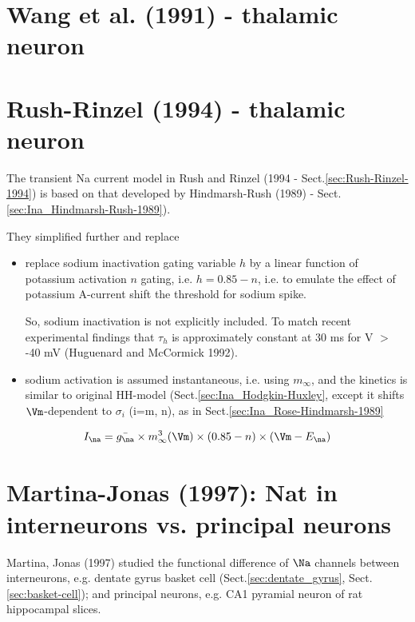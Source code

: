 \section{Wang et al. (1991) - thalamic neuron}
\label{sec:Ina_Wang1991}

\section{Rush-Rinzel (1994) - thalamic neuron}
\label{sec:Ina_Rush-Rinzel1994}

The transient Na current model in Rush and Rinzel (1994 -
Sect.\ref{sec:Rush-Rinzel-1994}) is based on that developed by Hindmarsh-Rush
(1989) - Sect.\ref{sec:Ina_Hindmarsh-Rush-1989}).

They simplified further and replace 
\begin{itemize}
  
  \item replace sodium inactivation gating variable $h$ by a linear function of
  potassium activation $n$ gating, i.e. $h = 0.85 - n$, i.e. to emulate the
  effect of potassium A-current shift the threshold for sodium spike.

So, sodium inactivation is not explicitly included.
To match recent experimental findings that $\tau_h$ is approximately constant at
30 ms for V $>$ -40 mV (Huguenard and McCormick 1992).

  
  \item sodium activation is assumed instantaneous, i.e. using $m_\infty$, and 
  the kinetics is similar to original HH-model
  (Sect.\ref{sec:Ina_Hodgkin-Huxley}, except it shifts $\Vm$-dependent to
  $\sigma_i$ (i=m, n), as in Sect.\ref{sec:Ina_Rose-Hindmarsh-1989}
  
\end{itemize}

\begin{equation}
I_\na = \bar{g_\na} \times m_\infty^3(\Vm) \times (0.85 - n) \times (\Vm -
E_\na)
\end{equation}


\section{Martina-Jonas (1997): Nat in interneurons vs. principal neurons}
\label{sec:Nat-Martina-Jonas-1997-interneuron-DG-basket-cells}
\label{sec:Nat-Martina-Jonas-1997-pyramidal-CA1}

Martina, Jonas (1997) studied the functional difference of $\Na$ channels
between interneurons, e.g. dentate gyrus basket cell
(Sect.\ref{sec:dentate_gyrus}, Sect.\ref{sec:basket-cell}); and principal
neurons, e.g. CA1 pyramial neuron of rat hippocampal slices.

